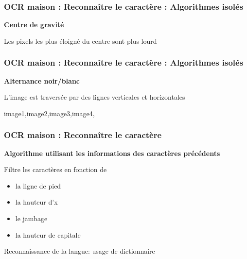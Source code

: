 \documentclass[xcolor=dvipsnames]{beamer}
\begin{document}
\begin{frame}
  \frametitle{OCR maison : Reconnaître le caractère : Algorithmes isolés}

  \begin{center}\begin{alertblock}{}
    \begin{center}\textbf{\Large Centre de gravité}\end{center}
  \end{alertblock}\end{center}

  \begin{center}
   Les pixels les plus éloigné du centre sont plus lourd
  \end{center}

\end{frame}


\begin{frame}
  \frametitle{OCR maison : Reconnaître le caractère : Algorithmes isolés}

  \begin{center}\begin{alertblock}{}
    \begin{center}\textbf{\Large Alternance noir/blanc}\end{center}
  \end{alertblock}\end{center}

  \begin{center}
   L'image est traversée par des lignes verticales et horizontales
   
   image1,image2,image3,image4,
  \end{center}
  
\end{frame}


\begin{frame}
  \frametitle{OCR maison : Reconnaître le caractère}

  \begin{center}\begin{alertblock}{}
    \begin{center}\textbf{\Large Algorithme utilisant les informations des caractères précédents}\end{center}
  \end{alertblock}\end{center}
  
  \begin{center}
    Filtre les caractères en fonction de

    \begin{itemize}
    \item la ligne de pied
    \item la hauteur d'x
    \item le jambage
    \item la hauteur de capitale
    \end{itemize}
  \end{center}

  \begin{center}
    Reconnaissance de la langue: usage de dictionnaire
  \end{center}
  
\end{frame}

  
\end{document}

